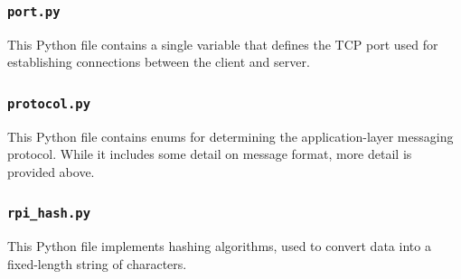 \documentclass{article}
\begin{document}
\subsubsection{\texttt{port.py}}
This Python file contains a single variable that defines the TCP port used
for establishing connections between the client and server.

\subsubsection{\texttt{protocol.py}}
This Python file contains enums for determining the application-layer messaging protocol.
While it includes some detail on message format, more detail is provided above.

\subsubsection{\texttt{rpi\_hash.py}}
This Python file implements hashing algorithms, used to convert data into a fixed-length string of characters.
\end{document}
